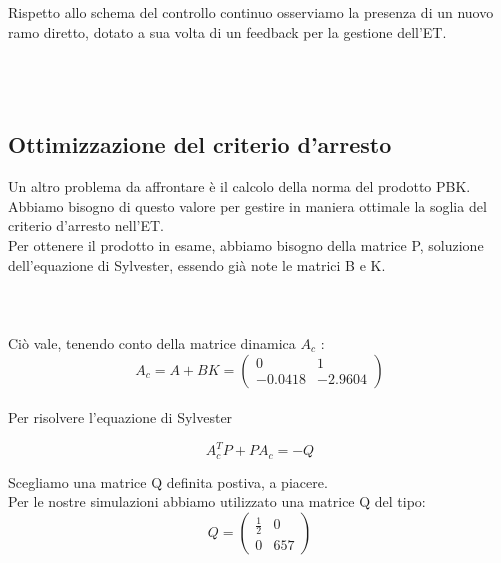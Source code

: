 \documentclass[a4paper,13pt]{article}
\begin{document}
	Rispetto allo schema del controllo continuo osserviamo la presenza di un nuovo ramo diretto, dotato a sua volta di un
	feedback per la gestione dell'ET.\\ \\ \\ \\
	
\subsection{Ottimizzazione del criterio d'arresto}
	Un altro problema da affrontare è il calcolo della norma del prodotto PBK.
	Abbiamo bisogno di questo valore per gestire in maniera ottimale la soglia del criterio d'arresto nell'ET.\\
	Per ottenere il prodotto in esame, abbiamo bisogno della matrice P, soluzione dell'equazione di Sylvester, essendo già 	note le matrici B e K.\\ \\ \\ \\
	Ciò vale, tenendo conto della matrice dinamica $A_{c}$ :\\
	
\begin{equation*}
	A_{c}=A+BK=
\begin{pmatrix}

	0&1\\-0.0418&-2.9604

\end{pmatrix}
\end{equation*} \\
	
	Per risolvere l'equazione di Sylvester
	
\begin{equation*}
	A_{c}^{T}P + PA_{c} = -Q              %
\end{equation*}

	Scegliamo una matrice Q definita postiva, a piacere.\\
	Per le nostre simulazioni abbiamo utilizzato una matrice Q del tipo:\\

\begin{equation*}
	Q=
\begin{pmatrix}

	\frac{1}{2}&0\\0&657

\end{pmatrix}
\end{equation*}\\
	
\end{document}
